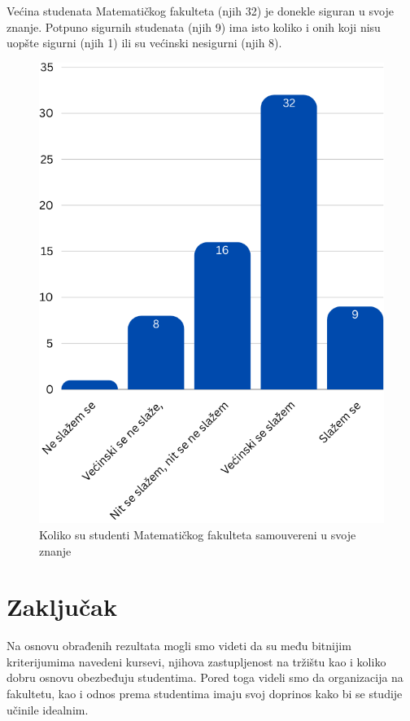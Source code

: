 \documentclass[a4paper]{article}
\begin{document}
{Većina studenata Matematičkog fakulteta (njih 32) je donekle siguran u svoje znanje. Potpuno sigurnih studenata (njih 9) ima isto koliko i onih koji nisu uopšte sigurni (njih 1) ili su većinski nesigurni (njih 8).
\begin{figure}[h!]
\begin{center}
    \includegraphics[scale = 0.3]{SamouverenostStudenataMatf.png}
    \caption{Koliko su studenti Matematičkog fakulteta samouvereni u svoje znanje}
    \label{fig:samouverenost_matf}
\end{center}
\end{figure}


\section{Zaključak}
\label{sec:zakljucak}

Na osnovu obrađenih rezultata mogli smo videti da su među bitnijim kriterijumima navedeni kursevi, njihova zastupljenost na tržištu kao i koliko dobru osnovu obezbeđuju studentima. Pored toga videli smo da organizacija na fakultetu, kao i odnos prema studentima imaju svoj doprinos kako bi se studije učinile idealnim. 

}
\end{document}
